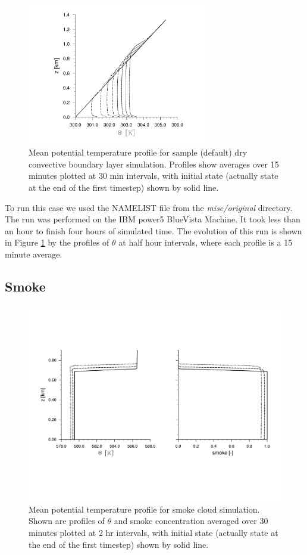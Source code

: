 \documentclass[11pt,a4paper]{article}
\begin{document}
\begin{figure}
\centering \leavevmode 
\includegraphics[width=8cm]{cbl}
\caption{Mean potential temperature profile for sample (default) dry
convective boundary layer simulation.  Profiles show averages over
15 minutes plotted at 30 min intervals, with initial state 
(actually state at the end of the first timestep) shown by solid line.}
\label{fig:cbl}
\end{figure}

To run this case we used the NAMELIST
file from the \emph{misc/original} directory. The run was
performed on the IBM power5 BlueVista Machine. It took
less than an hour to finish four hours of simulated time.
The evolution of this run is shown in Figure \ref{fig:cbl} by the
profiles of $\theta$ at half hour intervals, where each profile is a
15 minute average.

\subsection{Smoke} 

\begin{figure}
\centering \leavevmode 
\includegraphics[width=12cm]{smoke}
\caption{Mean potential temperature profile for smoke cloud
simulation.  Shown are profiles of $\theta $ and smoke concentration
averaged over 30 minutes plotted at 2 hr intervals, with initial state
(actually state at the end of the first timestep) shown by solid
line.}
\label{fig:smoke}
\end{figure}
\end{document}
